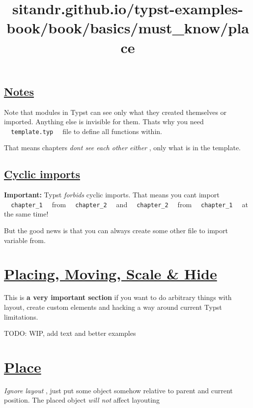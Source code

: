 \subsection{\texorpdfstring{\hyperref[notes]{Notes}}{Notes}}\label{notes}

Note that modules in Typst can see only what they created themselves or
imported. Anything else is invisible for them. That\textquotesingle s
why you need \texttt{\ }{\texttt{\ template.typ\ }}\texttt{\ } file to
define all functions within.

That means chapters \emph{don\textquotesingle t see each other either} ,
only what is in the template.

\subsection{\texorpdfstring{\hyperref[cyclic-imports]{Cyclic
imports}}{Cyclic imports}}\label{cyclic-imports}

\textbf{Important:} Typst \emph{forbids} cyclic imports. That means you
can\textquotesingle t import
\texttt{\ }{\texttt{\ chapter\_1\ }}\texttt{\ } from
\texttt{\ }{\texttt{\ chapter\_2\ }}\texttt{\ } and
\texttt{\ }{\texttt{\ chapter\_2\ }}\texttt{\ } from
\texttt{\ }{\texttt{\ chapter\_1\ }}\texttt{\ } at the same time!

But the good news is that you can always create some other file to
import variable from.


\title{sitandr.github.io/typst-examples-book/book/basics/must_know/place}

\section{\texorpdfstring{\hyperref[placing-moving-scale--hide]{Placing,
Moving, Scale \&
Hide}}{Placing, Moving, Scale \& Hide}}\label{placing-moving-scale--hide}

This is \textbf{a very important section} if you want to do arbitrary
things with layout, create custom elements and hacking a way around
current Typst limitations.

TODO: WIP, add text and better examples

\section{\texorpdfstring{\hyperref[place]{Place}}{Place}}\label{place}

\emph{Ignore layout} , just put some object somehow relative to parent
and current position. The placed object \emph{will not} affect layouting

